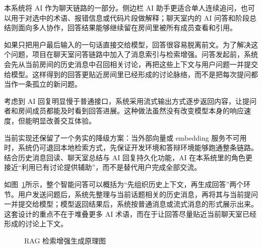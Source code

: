 本系统将 AI 作为聊天链路的一部分。侧边栏 AI 助手更适合单人连续追问，也可以用于对选中的术语、报错信息或代码片段做解释；聊天室内的 AI 问答和阶段总结则面向多人协作，回答结果能够继续留在房间里被所有成员查看和引用。

如果只把用户最后输入的一句话直接交给模型，回答很容易脱离前文。为了解决这个问题，项目在聊天室问答链路中加入了消息索引与检索增强。问答发起前，系统会先从当前房间的历史消息中召回相关讨论，再把这些上下文与用户问题一并提交给模型。这样得到的回答更贴近房间里已经形成的讨论脉络，而不是把每次提问都当作一条孤立的新问题。

考虑到 AI 回复明显慢于普通接口，系统采用流式输出方式逐步返回内容，让提问者和房间成员都能及时看到回答进展。这种做法虽然没有改变模型本身的响应速度，但能明显改善交互体验。

当前实现还保留了一个务实的降级方案：当外部向量或 embedding 服务不可用时，系统仍可退回本地检索方式，先保证开发环境和答辩环境能够跑通整条链路。结合历史消息回读、聊天室总结与 AI 回复持久化功能，AI 在本系统里的角色更接近“利用已有讨论提供辅助”，而不是替代用户完成全部交流。

如图~\ref{fig:2-2}所示，整个智能问答可以概括为“先组织历史上下文，再生成回答”两个环节。用户发送问题后，系统先整理与当前话题相关的历史消息，再将其与当前提问一并提交给模型；模型返回结果后，系统按普通消息或流式消息的形式展示出来。这套设计的重点不在于堆叠更多 AI 术语，而在于让回答尽量贴近当前聊天室已经形成的讨论上下文。

\begin{figure}[H]
\centering
{}
\caption{RAG 检索增强生成原理图}
\label{fig:2-2}
\end{figure}
